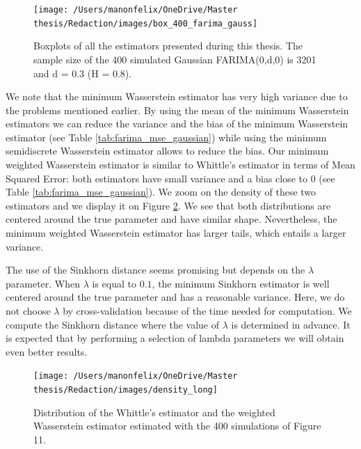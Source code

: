 \documentclass[
  11pt,
]{article}
\begin{document}
\begin{figure}

{\centering \texttt{[image: /Users/manonfelix/OneDrive/Master thesis/Redaction/images/box\_400\_farima\_gauss]} 

}

\caption{Boxplots of all the estimators presented during this thesis. The sample size of the 400 simulated Gaussian FARIMA(0,d,0) is 3201 and d = 0.3 (H = 0.8).}\label{fig:box_farima_400}
\end{figure}

We note that the minimum Wasserstein estimator has very high variance
due to the problems mentioned earlier. By using the mean of the minimum
Wasserstein estimators we can reduce the variance and the bias of the
minimum Wasserstein estimator (see Table \ref{tab:farima_mse_gaussian})
while using the minimum semidiscrete Wasserstein estimator allows to
reduce the bias. Our minimum weighted Wasserstein estimator is similar
to Whittle's estimator in terms of Mean Squared Error: both estimators
have small variance and a bias close to \(0\) (see Table
\ref{tab:farima_mse_gaussian}). We zoom on the density of these two
estimators and we display it on Figure \ref{fig:density_long_gauss}. We
see that both distributions are centered around the true parameter and
have similar shape. Nevertheless, the minimum weighted Wasserstein
estimator has larger tails, which entails a larger variance.

The use of the Sinkhorn distance seems promising but depends on the
\(\lambda\) parameter. When \(\lambda\) is equal to \(0.1\), the minimum
Sinkhorn estimator is well centered around the true parameter and has a
reasonable variance. Here, we do not choose \(\lambda\) by
cross-validation because of the time needed for computation. We compute
the Sinkhorn distance where the value of \(\lambda\) is determined in
advance. It is expected that by performing a selection of lambda
parameters we will obtain even better results.

\begin{figure}

{\centering \texttt{[image: /Users/manonfelix/OneDrive/Master thesis/Redaction/images/density\_long]} 

}

\caption{Distribution of the Whittle's estimator and the weighted Wasserstein estimator estimated with the 400 simulations of Figure 11.}\label{fig:density_long_gauss}
\end{figure}
\end{document}
